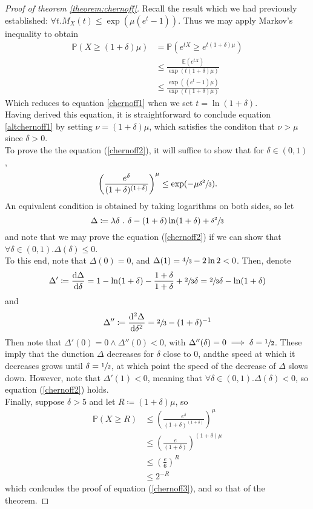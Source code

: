 	\begin{proof}[Proof of theorem \ref{theorem:chernoff}]
		Recall the result which we had previously established: $\forall t. M_X(t) \leq 
		\exp(\mu(e^t-1))$. Thus we may apply Markov's inequality to obtain
		\begin{align*}
			\mathbb{P}(X\geq(1+\delta)\mu) &=\mathbb{P}(e^{tX}\geq e^{t(1+\delta)\mu})
			\\
			&\leq \frac{\mathbb{E}(e^{tX})}{\exp(t(1+\delta)\mu)}\\
			&\leq \frac{\exp\left(\left(e^t-1\right)\mu\right)}{\exp(t(1+\delta)\mu)}
		\end{align*}
		Which reduces to equation \ref{chernoff1} when we set $t = \ln(1+\delta)$. \\
		Having derived this equation, it is straightforward to conclude equation 
		\ref{altchernoff1} by setting $\nu = (1+\delta) \mu$, which satisfies the conditon 
		that $\nu > \mu$ since $\delta > 0$.\\
		To prove the the equation (\ref{chernoff2}), it will suffice to show that for 
		$\delta \in (0,1)$, 
		$$
			\left(\frac{e^\delta}{(1+\delta)^{(1+\delta)}}\right)^\mu \leq
			\exp(-\mu\sfrac{\delta^2}{3}).
		$$
		An equivalent condition is obtained by taking logarithms on both sides, so let 
		$$
			\Delta \coloneqq \lambda \delta\ .\  
			\delta - (1+\delta) \ln (1+\delta) +\sfrac{\delta^2}{3}
		$$
		and note that we may prove the equation (\ref{chernoff2}) if we can show that 
		$\forall \delta\in (0,1). \Delta(\delta) \leq 0$.\\
		To this end, note that $\Delta(0) = 0$, and $\Delta(1) = \sfrac{4}{3} - 2\ln 2 <0$.
		Then, denote 
		$$
			\Delta' \coloneqq \frac{\mathrm{d}\Delta}{\mathrm{d}\delta} = 
			1 - \ln(1+\delta) - \frac{1+\delta}{1+\delta} +\sfrac{2}{3} \delta = 
			\sfrac{2}{3} \delta - \ln(1+\delta)
		$$
		and
		$$		
			\Delta'' \coloneqq \frac{\mathrm{d}^2\Delta}{\mathrm{d}\delta^2} = 
			\sfrac{2}{3} - (1+\delta)^{-1}
		$$
		Then note that $\Delta'(0) = 0 \land \Delta''(0) < 0$, with $\Delta''(\delta) = 0 
		\implies \delta=\sfrac{1}{2}$. These imply that the dunction $\Delta$ decreases for 
		$\delta$ close to $0$, andthe speed at which it decreases grows until $\delta=
		\sfrac{1}{2}$, at which point the speed of the decrease of $\Delta$ slows down.
		However, note that $\Delta'(1) < 0$, meaning that $\forall \delta \in (0,1). 
		\Delta(\delta) < 0$, so equation (\ref{chernoff2}) holds. \\
		Finally, suppose $\delta > 5$ and let $R \coloneqq (1+\delta)\mu$, so 
		\begin{align*}
			\mathbb{P}(X \geq R) &\leq 
			\left(\frac{e^\delta}{(1+\delta)^{(1+\delta)}}\right)^\mu \\
			&\leq \left(\frac{e}{(1+\delta)}\right)^{(1+\delta)\mu} \\
			&\leq \left(\frac{e}{6}\right)^R \\
			&\leq 2^{-R}
		\end{align*}
		which conlcudes the proof of equation (\ref{chernoff3}), and so that of the 
		theorem.
	\end{proof}


